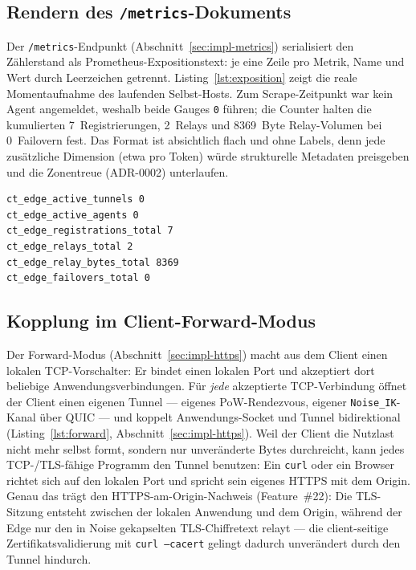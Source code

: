 \subsection{Rendern des \texttt{/metrics}-Dokuments}
\label{sec:impl-exposition}

Der \texttt{/metrics}-Endpunkt (Abschnitt~\ref{sec:impl-metrics}) serialisiert
den Zählerstand als Prometheus-Expositionstext: je eine Zeile pro Metrik, Name
und Wert durch Leerzeichen getrennt. Listing~\ref{lst:exposition} zeigt die
reale Momentaufnahme des laufenden Selbst-Hosts. Zum Scrape-Zeitpunkt war kein
Agent angemeldet, weshalb beide Gauges \texttt{0} führen; die Counter halten die
kumulierten 7~Registrierungen, 2~Relays und 8369~Byte Relay-Volumen bei
0~Failovern fest. Das Format ist absichtlich flach und ohne Labels, denn jede
zusätzliche Dimension (etwa pro Token) würde strukturelle Metadaten preisgeben
und die Zonentreue (ADR-0002) unterlaufen.

\begin{lstlisting}[caption={Reale \texttt{/metrics}-Ausgabe des Edge (Prometheus-Exposition, Scrape 2026-07-16).},label={lst:exposition}]
ct_edge_active_tunnels 0
ct_edge_active_agents 0
ct_edge_registrations_total 7
ct_edge_relays_total 2
ct_edge_relay_bytes_total 8369
ct_edge_failovers_total 0
\end{lstlisting}

\subsection{Kopplung im Client-Forward-Modus}
\label{sec:impl-forward-detail}

Der Forward-Modus (Abschnitt~\ref{sec:impl-https}) macht aus dem Client einen
lokalen TCP-Vorschalter: Er bindet einen lokalen Port und akzeptiert dort
beliebige Anwendungsverbindungen. Für \emph{jede} akzeptierte TCP-Verbindung
öffnet der Client einen eigenen Tunnel --- eigenes PoW-Rendezvous, eigener
\texttt{Noise\_IK}-Kanal über QUIC --- und koppelt Anwendungs-Socket und Tunnel
bidirektional (Listing~\ref{lst:forward}, Abschnitt~\ref{sec:impl-https}). Weil
der Client die Nutzlast nicht mehr selbst formt, sondern nur unveränderte Bytes
durchreicht, kann jedes TCP-/TLS-fähige Programm den Tunnel benutzen: Ein
\texttt{curl} oder ein Browser richtet sich auf den lokalen Port und spricht
sein eigenes HTTPS mit dem Origin. Genau das trägt den HTTPS-am-Origin-Nachweis
(Feature~\#22): Die TLS-Sitzung entsteht zwischen der lokalen Anwendung und dem
Origin, während der Edge nur den in Noise gekapselten TLS-Chiffretext relayt ---
die client-seitige Zertifikatsvalidierung mit \texttt{curl\ --cacert} gelingt
dadurch unverändert durch den Tunnel hindurch.
